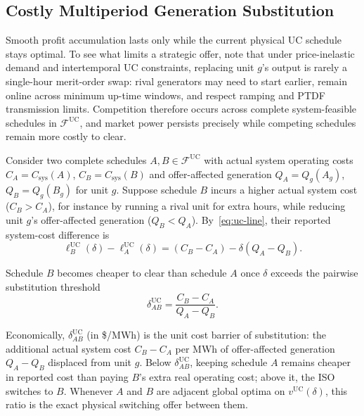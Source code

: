 \documentclass[journal]{IEEEtran}
\newcommand{\UC}{\mathrm{UC}}
\begin{document}
\subsection{Costly Multiperiod Generation Substitution}
Smooth profit accumulation lasts only while the current physical UC schedule stays optimal. To see what limits a strategic offer, note that under price-inelastic demand and intertemporal UC constraints, replacing unit $g$'s output is rarely a single-hour merit-order swap: rival generators may need to start earlier, remain online across minimum up-time windows, and respect ramping and PTDF transmission limits. Competition therefore occurs across complete system-feasible schedules in $\mathcal{F}^{\UC}$, and market power persists precisely while competing schedules remain more costly to clear.

Consider two complete schedules $A,B\in\mathcal{F}^{\UC}$ with actual system operating costs $C_A=C_{\mathrm{sys}}(A)$, $C_B=C_{\mathrm{sys}}(B)$ and offer-affected generation $Q_A=Q_g(A_g)$, $Q_B=Q_g(B_g)$ for unit $g$. Suppose schedule $B$ incurs a higher actual system cost ($C_B>C_A$), for instance by running a rival unit for extra hours, while reducing unit $g$'s offer-affected generation ($Q_B<Q_A$). By~\eqref{eq:uc-line}, their reported system-cost difference is
\begin{equation}
\ell_B^{\UC}(\delta) - \ell_A^{\UC}(\delta)
= (C_B - C_A) - \delta(Q_A - Q_B).\label{eq:substitution-comparison}
\end{equation}

Schedule $B$ becomes cheaper to clear than schedule $A$ once $\delta$ exceeds the pairwise substitution threshold
\begin{equation}
\delta_{AB}^{\UC} = \frac{C_B - C_A}{Q_A - Q_B}.\label{eq:threshold}
\end{equation}

Economically, $\delta_{AB}^{\UC}$ (in \$/MWh) is the unit cost barrier of substitution: the additional actual system cost $C_B-C_A$ per MWh of offer-affected generation $Q_A-Q_B$ displaced from unit $g$. Below $\delta_{AB}^{\UC}$, keeping schedule $A$ remains cheaper in reported cost than paying $B$'s extra real operating cost; above it, the ISO switches to $B$. Whenever $A$ and $B$ are adjacent global optima on $v^{\UC}(\delta)$, this ratio is the exact physical switching offer between them.
\end{document}
